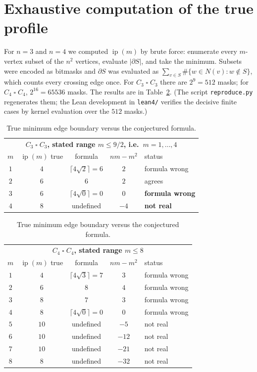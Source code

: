\documentclass[11pt]{article}
\theoremstyle{definition}
\begin{document}
\section{Exhaustive computation of the true profile}

For $n=3$ and $n=4$ we computed $\operatorname{ip}(m)$ by brute force: enumerate
every $m$-vertex subset of the $n^2$ vertices, evaluate $|\partial S|$, and take
the minimum. Subsets were encoded as bitmasks and $\partial S$ was evaluated as
$\sum_{v\in S}\#\{w\in N(v): w\notin S\}$, which counts every crossing edge once.
For $C_3\mathbin{\square} C_3$ there are $2^9=512$ masks; for
$C_4\mathbin{\square} C_4$, $2^{16}=65536$ masks. The results are in
Table~\ref{tab:results}. (The script \texttt{reproduce.py} regenerates them; the
Lean development in \texttt{lean4/} verifies the decisive finite cases by kernel
evaluation over the $512$ masks.)

\begin{table}[htbp]
\centering
\begin{tabular}{c|c|c|c|l}
\multicolumn{5}{c}{\textbf{$C_3\mathbin{\square} C_3$, stated range $m\le 9/2$, i.e.\ $m=1,\dots,4$}}\\[2pt]
$m$ & $\operatorname{ip}(m)$ true & formula & $nm-m^2$ & status\\ \hline
$1$ & $4$ & $\lceil 4\sqrt2\rceil=6$ & $2$  & formula wrong\\
$2$ & $6$ & $6$                 & $2$  & agrees\\
$3$ & $6$ & $\lceil 4\sqrt0\rceil=0$ & $0$ & \textbf{formula wrong}\\
$4$ & $8$ & undefined           & $-4$ & \textbf{not real}\\
\end{tabular}

\vspace{1.2em}

\begin{tabular}{c|c|c|c|l}
\multicolumn{5}{c}{\textbf{$C_4\mathbin{\square} C_4$, stated range $m\le 8$}}\\[2pt]
$m$ & $\operatorname{ip}(m)$ true & formula & $nm-m^2$ & status\\ \hline
$1$ & $4$  & $\lceil 4\sqrt3\rceil=7$  & $3$   & formula wrong\\
$2$ & $6$  & $8$                      & $4$   & formula wrong\\
$3$ & $8$  & $7$                      & $3$   & formula wrong\\
$4$ & $8$  & $\lceil 4\sqrt0\rceil=0$  & $0$   & formula wrong\\
$5$ & $10$ & undefined                & $-5$  & not real\\
$6$ & $10$ & undefined                & $-12$ & not real\\
$7$ & $10$ & undefined                & $-21$ & not real\\
$8$ & $8$  & undefined                & $-32$ & not real\\
\end{tabular}
\caption{True minimum edge boundary versus the conjectured formula.}
\label{tab:results}
\end{table}
\end{document}

